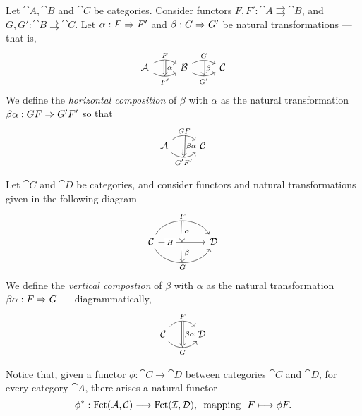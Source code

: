 \begin{definition}
\label{def:horizontal-composition-natural-transformation}
Let \(\cat A, \cat B\) and \(\cat C\) be categories. Consider functors \(F, F':
\cat A \rightrightarrows \cat B\), and \(G, G': \cat B \rightrightarrows \cat
C\).  Let \(\alpha: F \Rightarrow F'\) and \(\beta: G \Rightarrow G'\) be natural
transformations --- that is,
\[
  \begin{tikzcd}
    \cat A \ar[r, bend left, "F"{name=F}]
    \ar[r, bend right, "{F'}"'{name=FF}]
    &\cat B \ar[r, bend left, "G"{name=G}]
    \ar[r, bend right, "{G'}"'{name=GG}]
    & \cat C
    \ar[Rightarrow, from=F, to=FF, "\alpha"]
    \ar[Rightarrow, from=G, to=GG, "\beta"]
  \end{tikzcd}
\]
We define the \emph{horizontal composition} of \(\beta\) with \(\alpha\) as the
natural transformation \(\beta \alpha: G F \Rightarrow G' F'\) so that
\[
  \begin{tikzcd}
    \cat A \ar[r, bend left=40, "G F"{name=s}]
    \ar[r, bend right=40, swap, "{G' F'}"{name=t}]
    &\cat C
    \ar[Rightarrow, from=s, to=t, "\beta \alpha"]
  \end{tikzcd}
\]
\end{definition}

\begin{definition}
\label{def:vertical-compostion-natural-transformation}
Let \(\cat C\) and \(\cat D\) be categories, and consider functors and natural
transformations given in the following diagram
\[
  \begin{tikzcd}
  \cat C \ar[rr, bend left=60, "F"{name=F}]
  \ar[rr, "H"{near start, description}, ""'{name=H}, ""{name=HH}]
  \ar[rr, bend right=60, swap, "G"{name=G}]
  & &\cat D
  \ar[Rightarrow, "\alpha", from=F, to=H]
  \ar[Rightarrow, "\beta", from=HH, to=G]
  \end{tikzcd}
\]
We define the \emph{vertical compostion} of \(\beta\) with \(\alpha\) as the
natural transformation \(\beta \alpha: F \Rightarrow G\) --- diagrammatically,
\[
  \begin{tikzcd}
  \cat C \ar[r, bend left=50, "F"{name=F}]
  \ar[r, bend right=50, swap, "G"{name=G}]
  &\cat D
  \ar[Rightarrow, "\beta\alpha", from=F, to=G]
  \end{tikzcd}
\]
\end{definition}

Notice that, given a functor \(\phi: \cat C \to \cat D\) between categories
\(\cat C\) and \(\cat D\), for every category \(\cat A\), there arises a natural
functor
\[
  \phi^{*}: \operatorname{Fct}(\mathcal A, \mathcal C) \longrightarrow \operatorname{Fct}(\mathcal I, \mathcal D)\text{,}
  \ \text{ mapping }\
  F \longmapsto \phi F.
\]

